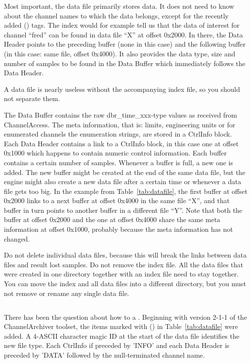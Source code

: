 Most important, the data file primarily stores data. It does not need
to know about the channel names to which the data belongs, except for
the recently added (\dag) tags. The index would for example tell us
that the data of interest for channel ``fred'' can be found in data
file ``X'' at offset 0x2000. In there, the Data Header points to the
preceding buffer (none in this case) and the following buffer (in this
case: same file, offset 0x4000). It also provides the data type, size
and number of samples to be found in the Data Buffer
which immediately follows the Data Header.

 A data file is nearly useless without the
accompanying index file, so you should not separate them.

\noindent The Data Buffer contains the raw dbr\_time\_xxx-type values
as received from ChannelAccess. The meta information, that is: limits,
engineering units or for enumerated channels the enumeration strings,
are stored in a CtrlInfo block. Each Data Header contains a link to a
CtrlInfo block, in this case one at offset 0x1000 which happens to
contain numeric control information.
Each buffer contains a certain number of samples. Whenever a buffer is
full, a new one is added. The new buffer might be created at the end
of the same data file, but the engine might also create a new data
file after a certain time or whenever a data file gets too big.
In the example from Table~\ref{tab:datafile}, the first buffer at offset
0x2000 links to a next buffer at offset 0x4000 in the same file ``X'',
and that buffer in turn points to another buffer in a different file
``Y''. Note that both the buffer at offset 0x2000 and the one at
offset 0x4000 share the same meta information at offset 0x1000,
probably because the meta information has not changed.

 Do not delete individual data
files, because this will break the links between data files and result
lost samples. Do not remove the index file. All the data files that were
created in one directory together with an index file need to stay together.
You can move the index and all data files into a different directory, but
you must not remove or rename any single data file.

\subsection{}
There has been the question about how to  a
.
Beginning with version 2-1-1 of the ChannelArchiver toolset, the items
marked with (\dag) in Table~\ref{tab:datafile} were added.  A
4-ASCII character magic ID at the start of the data file identifies
the new file type. Each CtrlInfo if preceded by 'INFO' and each Data
Header is preceded by 'DATA' followed by the null-terminated channel
name.

